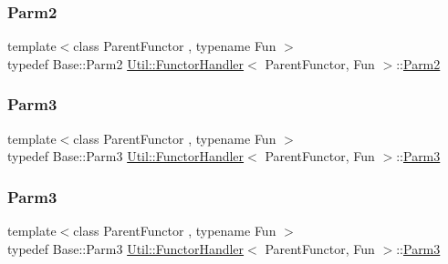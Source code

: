 \mbox{\label{classUtil_1_1FunctorHandler_a5fb5374c316f8ac252aa22fcdf7d21a7}} 
\subsubsection{\texorpdfstring{Parm2}{Parm2}\hspace{0.1cm}{\footnotesize\ttfamily [3/3]}}
{\footnotesize\ttfamily template$<$class Parent\+Functor , typename Fun $>$ \\
typedef Base\+::\+Parm2 \mbox{\hyperlink{classUtil_1_1FunctorHandler}{Util\+::\+Functor\+Handler}}$<$ Parent\+Functor, Fun $>$\+::\mbox{\hyperlink{classUtil_1_1FunctorHandler_a5fb5374c316f8ac252aa22fcdf7d21a7}{Parm2}}}

\mbox{\label{classUtil_1_1FunctorHandler_a25f1b9dd7890c1dbc68abc686f30bec8}} 
\subsubsection{\texorpdfstring{Parm3}{Parm3}\hspace{0.1cm}{\footnotesize\ttfamily [1/3]}}
{\footnotesize\ttfamily template$<$class Parent\+Functor , typename Fun $>$ \\
typedef Base\+::\+Parm3 \mbox{\hyperlink{classUtil_1_1FunctorHandler}{Util\+::\+Functor\+Handler}}$<$ Parent\+Functor, Fun $>$\+::\mbox{\hyperlink{classUtil_1_1FunctorHandler_a25f1b9dd7890c1dbc68abc686f30bec8}{Parm3}}}

\mbox{\label{classUtil_1_1FunctorHandler_a25f1b9dd7890c1dbc68abc686f30bec8}} 
\subsubsection{\texorpdfstring{Parm3}{Parm3}\hspace{0.1cm}{\footnotesize\ttfamily [2/3]}}
{\footnotesize\ttfamily template$<$class Parent\+Functor , typename Fun $>$ \\
typedef Base\+::\+Parm3 \mbox{\hyperlink{classUtil_1_1FunctorHandler}{Util\+::\+Functor\+Handler}}$<$ Parent\+Functor, Fun $>$\+::\mbox{\hyperlink{classUtil_1_1FunctorHandler_a25f1b9dd7890c1dbc68abc686f30bec8}{Parm3}}}

